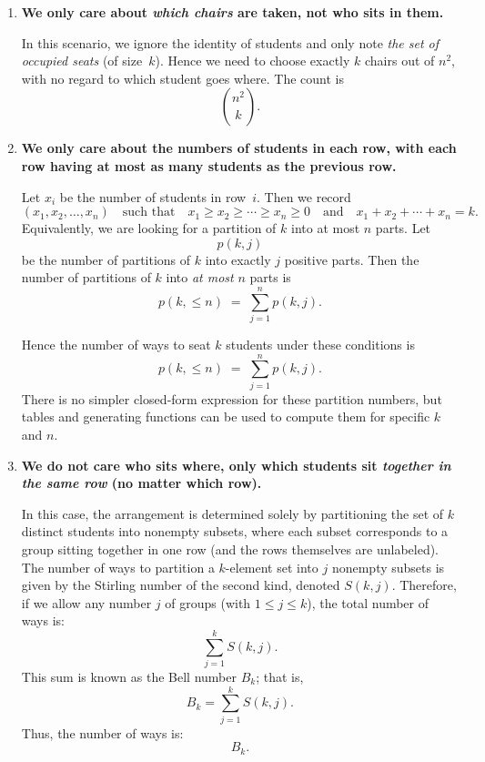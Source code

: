 \documentclass[docmute]{article}
\begin{document}
\begin{enumerate}
  \item[\textbf{(d)}]
    \textbf{We only care about \emph{which chairs} are taken, not who sits in them.}

    In this scenario, we ignore the identity of students and only note \emph{the set of occupied seats} (of size~\(k\)).  Hence we need to choose exactly \(k\) chairs out of \(n^2\), with no regard to which student goes where.  The count is
    \[
      \binom{n^2}{k}.
    \]

    \item[\textbf{(e)}]
    \textbf{We only care about the numbers of students in each row, with each row having at most as many students as the previous row.}
    
    Let \(x_i\) be the number of students in row~\(i\). Then we record
    \[
      (x_1,x_2,\ldots,x_n)
      \quad\text{such that}\quad
      x_1 \ge x_2 \ge \cdots \ge x_n \ge 0
      \quad\text{and}\quad
      x_1 + x_2 + \cdots + x_n = k.
    \]
    Equivalently, we are looking for a partition of \(k\) into at most \(n\) parts. Let
    \[
      p(k,j)
    \]
    be the number of partitions of \(k\) into exactly \(j\) positive parts. Then the number of partitions of \(k\) into \emph{at most} \(n\) parts is
    \[
      p(k,\le n)
      \;=\;
      \sum_{j=1}^n p(k,j).
    \]

    Hence the number of ways to seat \(k\) students under these conditions is
    \[
      \boxed{
        p(k,\le n) \;=\;\sum_{j=1}^n p(k,j).
      }
    \]
    There is no simpler closed‐form expression for these partition numbers, but tables and generating functions can be used to compute them for specific \(k\) and \(n\). 
    

    \item[\textbf{(f)}]
    \textbf{We do not care who sits where, only which students sit \emph{together in the same row} (no matter which row).}
    
    In this case, the arrangement is determined solely by partitioning the set of \(k\) distinct students into nonempty subsets, where each subset corresponds to a group sitting together in one row (and the rows themselves are unlabeled). The number of ways to partition a \(k\)-element set into \(j\) nonempty subsets is given by the Stirling number of the second kind, denoted \(S(k,j)\). Therefore, if we allow any number \(j\) of groups (with \(1 \le j \le k\)), the total number of ways is:
    \[
    \sum_{j=1}^{k} S(k,j).
    \]
    This sum is known as the Bell number \(B_k\); that is,
    \[
    B_k = \sum_{j=1}^{k} S(k,j).
    \]
    Thus, the number of ways is:
    \[
    \boxed{B_k.}
    \]
    

\end{enumerate}
\end{document}
